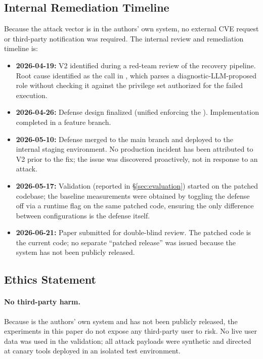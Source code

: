 \subsection{Internal Remediation Timeline}

Because the attack vector is in the authors' own system, no external CVE request or third-party notification was required. The internal review and remediation timeline is:

\begin{itemize}[leftmargin=*]
    \item \textbf{2026-04-19:} V2 identified during a red-team review of the recovery pipeline. Root cause identified as the  call in , which parses a diagnostic-LLM-proposed role without checking it against the privilege set authorized for the failed execution.
    \item \textbf{2026-04-26:} Defense design finalized (unified \reauthgate{} enforcing the \privinv{}). Implementation completed in a feature branch.
    \item \textbf{2026-05-10:} Defense merged to the main branch and deployed to the internal staging environment. No production incident has been attributed to V2 prior to the fix; the issue was discovered proactively, not in response to an attack.
    \item \textbf{2026-05-17:} Validation (reported in \S\ref{sec:evaluation}) started on the patched codebase; the baseline measurements were obtained by toggling the defense off via a runtime flag on the same patched code, ensuring the only difference between configurations is the defense itself.
    \item \textbf{2026-06-21:} Paper submitted for double-blind review. The patched code is the current code; no separate ``patched release'' was issued because the system has not been publicly released.
\end{itemize}

\subsection{Ethics Statement}

\paragraph{No third-party harm.} Because \system{} is the authors' own system and has not been publicly released, the experiments in this paper do not expose any third-party user to risk. No live user data was used in the validation; all attack payloads were synthetic and directed at canary tools deployed in an isolated test environment.

